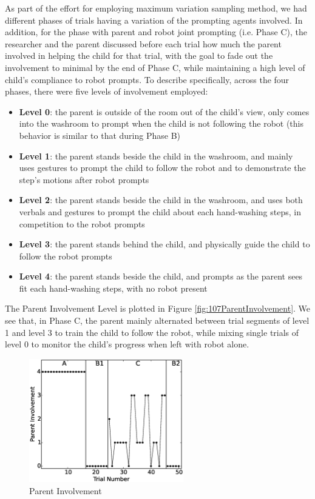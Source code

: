 As part of the effort for employing maximum variation sampling method, we had different phases of trials having a variation of the prompting agents involved.  In addition, for the phase with parent and robot joint prompting (i.e. Phase C), the researcher and the parent discussed before each trial how much the parent involved in helping the child for that trial, with the goal to fade out the involvement to minimal by the end of Phase C, while maintaining a high level of child's compliance to robot prompts.  To describe specifically, across the four phases, there were five levels of involvement employed:
\begin{itemize}
	\item \textbf{Level 0}: the parent is outside of the room out of the child's view, only comes into the washroom to prompt when the child is not following the robot (this behavior is similar to that during Phase B)
	\item \textbf{Level 1}: the parent stands beside the child in the washroom, and mainly uses gestures to prompt the child to follow the robot and to demonstrate the step's motions after robot prompts
	\item \textbf{Level 2}: the parent stands beside the child in the washroom, and uses both verbals and gestures to prompt the child about each hand-washing steps, in competition to the robot prompts
	\item \textbf{Level 3}: the parent stands behind the child, and physically guide the child to follow the robot prompts
	\item \textbf{Level 4}: the parent stands beside the child, and prompts as the parent sees fit each hand-washing steps, with no robot present
\end{itemize}
The Parent Involvement Level is plotted in Figure \ref{fig:107ParentInvolvement}.  We see that, in Phase C, the parent mainly alternated between trial segments of level 1 and level 3 to train the child to follow the robot, while mixing single trials of level 0 to monitor the child's progress when left with robot alone.
\begin{figure} [h]
	\centering
	\includegraphics[width=0.6\textwidth]{./img/data_analysis/6ParentInvolvement.eps}
	\caption{Parent Involvement}
	\label{fig:6ParentInvolvement}
\end{figure}

